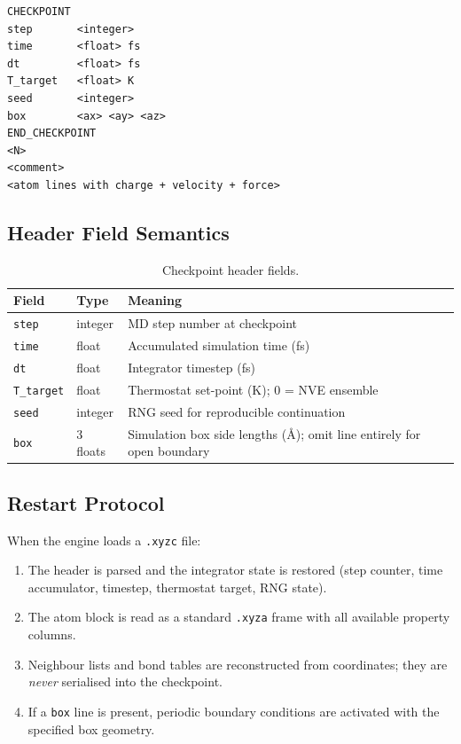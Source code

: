 \documentclass[12pt, a4paper, oneside]{article}
\begin{document}
\begin{lstlisting}[language={},frame=single]
CHECKPOINT
step       <integer>
time       <float> fs
dt         <float> fs
T_target   <float> K
seed       <integer>
box        <ax> <ay> <az>
END_CHECKPOINT
<N>
<comment>
<atom lines with charge + velocity + force>
\end{lstlisting}

\subsection{Header Field Semantics}

\begin{table}[htbp]
  \centering
  \caption{Checkpoint header fields.}
  \label{tab:xyzc_header}
  \begin{tabular}{llp{7.5cm}}
    \toprule
    Field & Type & Meaning \\
    \midrule
    \texttt{step}      & integer & MD step number at checkpoint \\
    \texttt{time}      & float   & Accumulated simulation time (fs) \\
    \texttt{dt}        & float   & Integrator timestep (fs) \\
    \texttt{T\_target} & float   & Thermostat set-point (K); 0 = NVE ensemble \\
    \texttt{seed}      & integer & RNG seed for reproducible continuation \\
    \texttt{box}       & 3 floats & Simulation box side lengths (\AA);
                                    omit line entirely for open boundary \\
    \bottomrule
  \end{tabular}
\end{table}

\subsection{Restart Protocol}

When the engine loads a \texttt{.xyzc} file:

\begin{enumerate}
  \item The header is parsed and the integrator state is restored
        (step counter, time accumulator, timestep, thermostat target,
        RNG state).
  \item The atom block is read as a standard \texttt{.xyza} frame
        with all available property columns.
  \item Neighbour lists and bond tables are reconstructed from
        coordinates; they are \emph{never} serialised into the
        checkpoint.
  \item If a \texttt{box} line is present, periodic boundary
        conditions are activated with the specified box geometry.
\end{enumerate}
\end{document}
